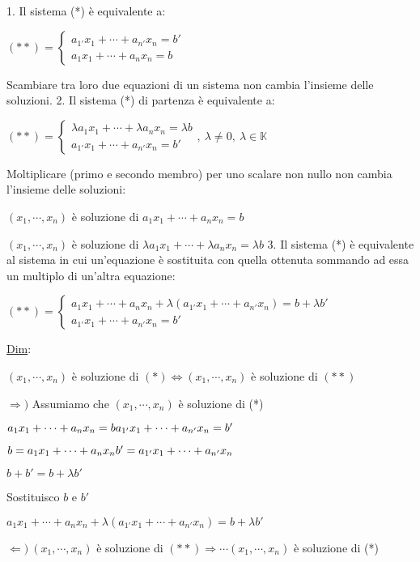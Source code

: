 \documentclass{article}
\begin{document}
1. Il sistema (*) è equivalente a:

   $(**)=\begin{cases}
      a_{1'}x_1+\cdots+a_{n'}x_n=b'\\
      a_1x_1+\cdots+a_nx_n=b
   \end{cases}$

   Scambiare tra loro due equazioni di un sistema non cambia l'insieme delle soluzioni.
2. Il sistema (*) di partenza è equivalente a:

   $(**)=\begin{cases}
      \lambda a_1x_1+\cdots+\lambda a_nx_n=\lambda b\\
      a_{1'}x_1+\cdots+a_{n'}x_n=b'
   \end{cases},\ \lambda\not=0,\ \lambda\in\mathbb{K}$

   Moltiplicare (primo e secondo membro) per uno scalare non nullo non cambia l'insieme delle soluzioni:

   $(x_1,\cdots,x_n)$ è soluzione di $a_1x_1+\cdots+a_nx_n=b$

   $(x_1,\cdots,x_n)$ è soluzione di $\lambda a_1x_1+\cdots+\lambda a_nx_n=\lambda b$
3. Il sistema (*) è equivalente al sistema in cui un'equazione è sostituita con quella ottenuta sommando ad essa un multiplo di un'altra equazione:

   $(**)=\begin{cases}
      a_1x_1+\cdots+a_nx_n+\lambda(a_{1'}x_1+\cdots+a_{n'}x_n)=b+\lambda b'\\
      a_{1'}x_1+\cdots+a_{n'}x_n=b'
   \end{cases}$

   \ul{Dim}:

   $(x_1,\cdots,x_n)$ è soluzione di $(*)\Leftrightarrow(x_1,\cdots,x_n)$ è soluzione di $(**)$

   $\Rightarrow)$ Assumiamo che $(x_1,\cdots,x_n)$ è soluzione di (*)

    $a_1x_1+\cdots+a_nx_n=b\\a_{1'}x_1+\cdots+a_{n'}x_n=b'$

    $b=a_1x_1+\cdots+a_nx_n\\b'=a_{1'}x_1+\cdots+a_{n'}x_n$

    $b+b'=b+\lambda b'$

    Sostituisco $b$ e $b'$

    $a_1x_1+\cdots+a_nx_n+\lambda(a_{1'}x_1+\cdots+a_{n'}x_n)=b+\lambda b'$

    $\Leftarrow)\ (x_1,\cdots,x_n)$ è soluzione di $(**)\Rightarrow\cdots(x_1,\cdots,x_n)$ è soluzione di (*)
\end{document}
